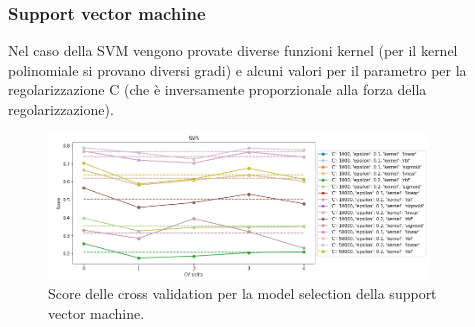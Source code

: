 \documentclass{article}
\begin{document}
\subsubsection{Support vector machine}
Nel caso della SVM vengono provate diverse funzioni kernel (per il kernel
polinomiale si provano diversi gradi) e alcuni valori per il parametro per la
regolarizzazione C (che è inversamente proporzionale alla forza della
regolarizzazione).
\begin{figure}[ht]
	\centering
	\includegraphics[width=0.9\textwidth]{svmcv.png}
	\caption{Score delle cross validation per la model selection della support
	vector machine.}
\end{figure}
\end{document}
